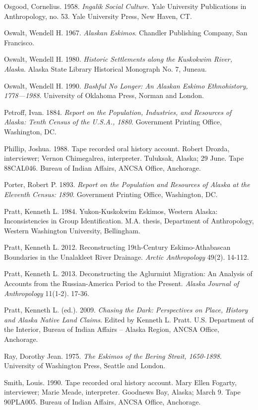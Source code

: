 \begin{hang}
Osgood, Cornelius. 1958.	\textit{Ingalik Social Culture}. Yale University Publications in Anthropology, no. 53. Yale University Press, New Haven, CT.

Oswalt, Wendell H. 1967. \textit{Alaskan Eskimos}. Chandler Publishing Company, San Francisco.

Oswalt, Wendell H. 1980. \textit{Historic Settlements along the Kuskokwim River, Alaska}. Alaska State Library Historical Monograph No. 7, Juneau.

Oswalt, Wendell H. 1990. \textit{Bashful No Longer: An Alaskan Eskimo Ethnohistory, 1778—1988}. University of Oklahoma Press, Norman and London.

Petroff, Ivan. 1884. \textit{Report on the Population, Industries, and Resources of Alaska: Tenth Census of the U.S.A., 1880}. Government Printing Office, Washington, DC.

Phillip, Joshua. 1988. Tape recorded oral history account. Robert Drozda, interviewer; Vernon Chimegalrea, interpreter. Tuluksak, Alaska; 29 June. Tape 88CAL046. Bureau of Indian Affairs, ANCSA Office, Anchorage.

Porter, Robert P. 1893. \textit{Report on the Population and Resources of Alaska at the Eleventh Census: 1890}. Government Printing Office, Washington, DC.

Pratt, Kenneth L. 1984. Yukon-Kuskokwim Eskimos, Western Alaska: Inconsistencies in Group Identification.  M.A. thesis, Department of Anthropology, Western Washington University, Bellingham.

Pratt, Kenneth L. 2012. Reconstructing 19th-Century Eskimo-Athabascan Boundaries in the Unalakleet River Drainage. \textit{Arctic Anthropology} 49(2). 14-112.

Pratt, Kenneth L. 2013. Deconstructing the Aglurmiut Migration: An Analysis of Accounts from the Russian-America Period to the Present. \textit{Alaska Journal of Anthropology} 11(1-2). 17-36.

Pratt, Kenneth L. (ed.). 2009. \textit{Chasing the Dark: Perspectives on Place, History and Alaska Native Land Claims}. Edited by Kenneth L. Pratt. U.S. Department of the Interior, Bureau of Indian Affairs – Alaska Region, ANCSA Office, Anchorage.

Ray, Dorothy Jean. 1975. \textit{The Eskimos of the Bering Strait, 1650-1898}. University of Washington Press, Seattle and London.

Smith, Louis. 1990. Tape recorded oral history account. Mary Ellen Fogarty, interviewer; Marie Meade, interpreter. Goodnews Bay, Alaska; March 9. Tape 90PLA005. Bureau of Indian Affairs, ANCSA Office, Anchorage.


\end{hang}
